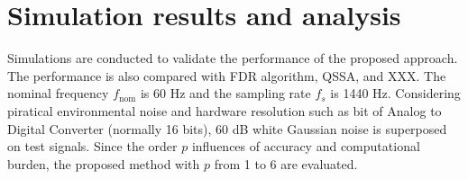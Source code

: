 \documentclass[journal,twoside]{IEEEtran}
\begin{document}








\section{Simulation results and analysis}
Simulations are conducted to validate the performance of the proposed approach. The performance is also compared with FDR algorithm, QSSA, and XXX.
The nominal frequency $f_\mathrm{nom}$ is 60 Hz and the sampling rate $f_s$ is 1440 Hz.  Considering 
piratical  environmental noise and hardware resolution such as bit of  
Analog to Digital Converter (normally 16 bits), 60 dB white Gaussian noise is superposed on  test signals. Since the order $p$ influences of accuracy and computational burden, the proposed method with $p$ from 1 to 6 are evaluated. 
\end{document}
